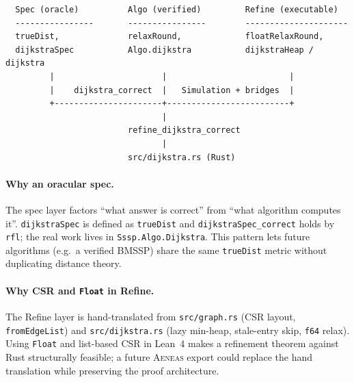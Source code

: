 \documentclass[11pt,a4paper]{article}
\newcommand{\Lean}{Lean~4\xspace}
\newcommand{\BMSSP}{\textsc{BMSSP}\xspace}
\newcommand{\code}[1]{\texttt{#1}}
\theoremstyle{plain}
\theoremstyle{definition}
\begin{document}
\begin{verbatim}
  Spec (oracle)          Algo (verified)         Refine (executable)
  ----------------       ----------------        ---------------------
  trueDist,              relaxRound,             floatRelaxRound,
  dijkstraSpec           Algo.dijkstra           dijkstraHeap / dijkstra
         |                      |                         |
         |    dijkstra_correct  |   Simulation + bridges  |
         +----------------------+-------------------------+
                                |
                         refine_dijkstra_correct
                                |
                         src/dijkstra.rs (Rust)
\end{verbatim}

\paragraph*{Why an oracular spec.}
The spec layer factors ``what answer is correct'' from ``what algorithm
computes it''. \code{dijkstraSpec} is defined as \code{trueDist} and
\code{dijkstraSpec\_correct} holds by \code{rfl}; the real work lives in
\code{Sssp.Algo.Dijkstra}. This pattern lets future algorithms (e.g.\ a
verified \BMSSP{}) share the same \code{trueDist} metric without duplicating
distance theory.

\paragraph*{Why CSR and \code{Float} in Refine.}
The Refine layer is hand-translated from \code{src/graph.rs} (CSR layout,
\code{fromEdgeList}) and \code{src/dijkstra.rs} (lazy min-heap, stale-entry
skip, \code{f64} relax). Using \code{Float} and list-based CSR in \Lean{}
makes a refinement theorem against Rust structurally feasible; a future
\textsc{Aeneas} export could replace the hand translation while preserving
the proof architecture.
\end{document}
